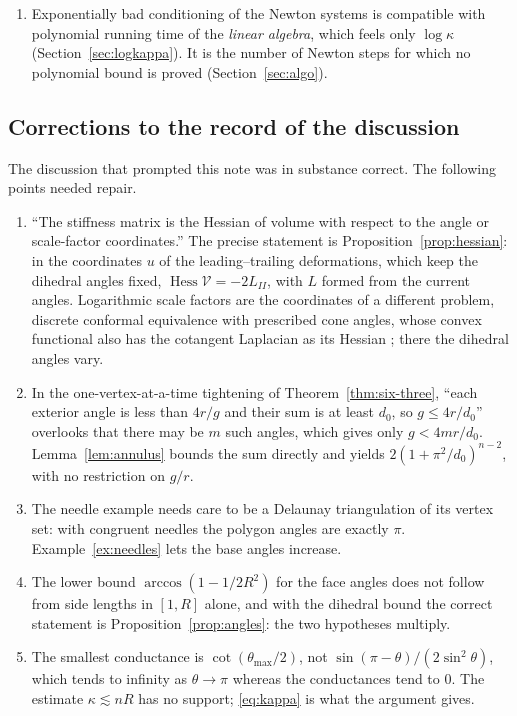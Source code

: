 \documentclass[11pt]{amsart}
\theoremstyle{definition}
\theoremstyle{remark}
\begin{document}
\begin{enumerate}[leftmargin=*,itemsep=3pt]
\item Exponentially bad conditioning of the Newton systems is compatible with polynomial running time of the \emph{linear algebra}, which feels only $\log\kappa$ (Section~\ref{sec:logkappa}). It is the number of Newton steps for which no polynomial bound is proved (Section~\ref{sec:algo}).
\end{enumerate}

\subsection*{Corrections to the record of the discussion}
The discussion that prompted this note was in substance correct. The following points needed repair.
\begin{enumerate}[leftmargin=*,itemsep=3pt]
\item ``The stiffness matrix is the Hessian of volume with respect to the angle or scale-factor coordinates.'' The precise statement is Proposition~\ref{prop:hessian}: in the coordinates $u$ of the leading--trailing deformations, which keep the dihedral angles fixed, $\operatorname{Hess}\mathcal V=-2L_{II}$, with $L$ formed from the current angles.
Logarithmic scale factors are the coordinates of a different problem, discrete conformal equivalence with prescribed cone angles, whose convex functional also has the cotangent Laplacian as its Hessian \cite{BPS15}; there the dihedral angles vary.
\item In the one-vertex-at-a-time tightening of Theorem~\ref{thm:six-three}, ``each exterior angle is less than $4r/g$ and their sum is at least $d_0$, so $g\le4r/d_0$'' overlooks that there may be $m$ such angles, which gives only $g<4mr/d_0$. Lemma~\ref{lem:annulus} bounds the sum directly and yields $2(1+\pi^2/d_0)^{n-2}$, with no restriction on $g/r$.
\item The needle example needs care to be a Delaunay triangulation of its vertex set: with congruent needles the polygon angles are exactly $\pi$. Example~\ref{ex:needles} lets the base angles increase.
\item The lower bound $\arccos(1-1/2R^2)$ for the face angles does not follow from side lengths in $[1,R]$ alone, and with the dihedral bound the correct statement is Proposition~\ref{prop:angles}: the two hypotheses multiply.
\item The smallest conductance is $\cot(\theta_{\max}/2)$, not $\sin(\pi-\theta)/(2\sin^2\theta)$, which tends to infinity as $\theta\to\pi$ whereas the conductances tend to $0$. The estimate $\kappa\lesssim nR$ has no support; \eqref{eq:kappa} is what the argument gives.

\end{enumerate}
\end{document}
